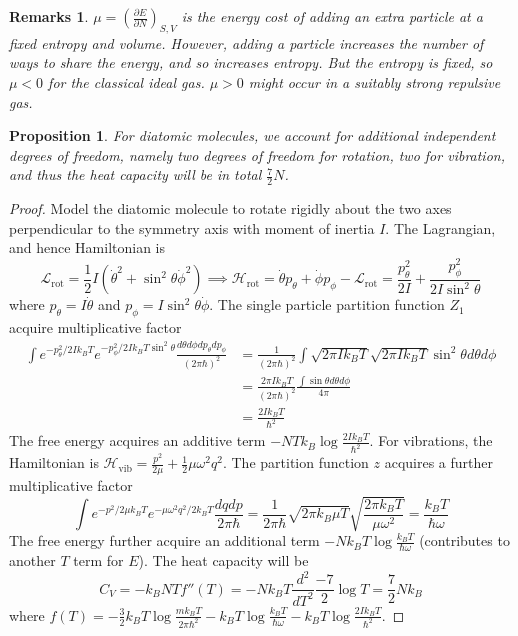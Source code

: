 \documentclass[a4paper]{article}
\newtheorem{remarks}{Remarks}[section]
\theoremstyle{new}
\newtheorem{prop}{Proposition}[section]
\begin{document}
\begin{remarks}
$\mu=(\frac{\partial E}{\partial N})_{S,V}$ is the energy cost of adding an extra particle at a fixed entropy and volume. However, adding a particle increases the number of ways to share the energy, and so increases entropy. But the entropy is fixed, so $\mu<0$ for the classical ideal gas. $\mu>0$ might occur in a suitably strong repulsive gas.
\end{remarks}
\begin{prop}
For diatomic molecules, we account for additional independent degrees of freedom, namely two degrees of freedom for rotation, two for vibration, and thus the heat capacity will be in total $\frac{7}{2}N$.
\end{prop}
\begin{proof}
Model the diatomic molecule to rotate rigidly about the two axes perpendicular to the symmetry axis with moment of inertia $I$. The Lagrangian, and hence Hamiltonian is
$$\mathcal{L}_{\text{rot}}=\frac{1}{2}I(\dot{\theta}^2+\sin^2\theta\dot{\phi}^2)\implies \mathcal{H}_{\text{rot}}=\dot{\theta}p_\theta+\dot{\phi}p_\phi-\mathcal{L}_{\text{rot}}=\frac{p_\theta^2}{2I}+\frac{p_\phi^2}{2I\sin^2\theta}$$
where $p_\theta=I\dot{\theta}$ and $p_\phi=I\sin^2\theta\dot{\phi}$. The single particle partition function $Z_1$ acquire multiplicative factor
\begin{align}
\int e^{-p_\theta^2/2Ik_BT}e^{-p_\phi^2/2Ik_BT\sin^2\theta}\frac{d\theta d\phi dp_\theta dp_\phi}{(2\pi\hbar)^2}&=\frac{1}{(2\pi\hbar)^2}\int\sqrt{2\pi Ik_BT}\sqrt{2\pi Ik_BT}\sin^2\theta d\theta d\phi\nonumber\\&=\frac{2\pi Ik_BT}{(2\pi\hbar)^2}\frac{\int\sin\theta d\theta d\phi}{4\pi}\nonumber\\&=\frac{2Ik_BT}{\hbar^2}\nonumber
\end{align}
The free energy acquires an additive term $-NTk_B\log\frac{2Ik_BT}{\hbar^2}$. For vibrations, the Hamiltonian is $\mathcal{H}_{\text{vib}}=\frac{p^2}{2\mu}+\frac{1}{2}\mu\omega^2q^2$. The partition function $z$ acquires a further multiplicative factor
$$\int e^{-p^2/2\mu k_B T}e^{-\mu\omega^2q^2/2k_BT}\frac{dqdp}{2\pi\hbar}=\frac{1}{2\pi\hbar}\sqrt{2\pi k_B\mu T}\sqrt{\frac{2\pi k_B T}{\mu\omega^2}}=\frac{k_BT}{\hbar\omega}$$
The free energy further acquire an additional term $-Nk_BT\log\frac{k_BT}{\hbar\omega}$ (contributes to another $T$ term for $E$). 
The heat capacity will be 
$$C_V=-k_BNTf''(T)=-Nk_BT\frac{d^2}{dT^2}\frac{-7}{2}\log T=\frac{7}{2}Nk_B$$
where $f(T)=-\frac{3}{2}k_BT\log\frac{mk_BT}{2\pi\hbar^2}-k_BT\log\frac{k_BT}{\hbar\omega}-k_BT\log\frac{2Ik_BT}{\hbar^2}$. 
\end{proof}
\end{document}

